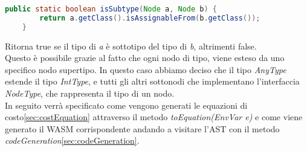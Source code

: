 \documentclass[../../main.tex]{subfiles}
\begin{document}
\begin{lstlisting}[language=Java, caption={Metodo isSubtype}]
    public static boolean isSubtype(Node a, Node b) {
        return a.getClass().isAssignableFrom(b.getClass()); 
    }
\end{lstlisting}
Ritorna true se il tipo di \textit{a} è sottotipo del tipo di \textit{b}, altrimenti false.\\
Questo è possibile grazie al fatto che ogni nodo di tipo, viene esteso da uno specifico nodo supertipo. In questo caso abbiamo deciso che il tipo \textit{AnyType} estende il tipo \textit{IntType}, e tutti gli altri sottonodi che implementano l'interfaccia \textit{NodeType}, che rappresenta il tipo di un nodo.\\

In seguito verrà specificato come vengono generati le equazioni di costo\ref{sec:costEquation} attraverso il metodo \textit{toEquation(EnvVar e)} e come viene generato il WASM corrispondente andando a visitare l'AST con il metodo \textit{codeGeneration}\ref{sec:codeGeneration}.\\ 
\end{document}
